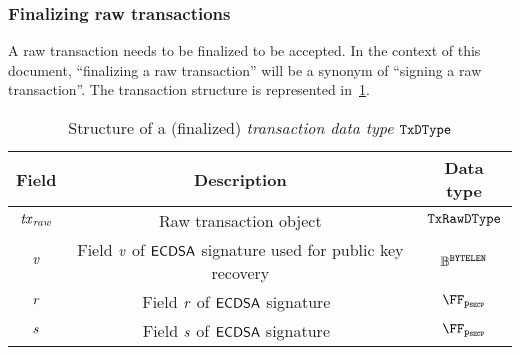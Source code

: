 \subsubsection{Finalizing raw transactions}\label{preliminaries:ethereum:eth-tx:final}
A raw transaction needs to be finalized to be accepted. In the context of this document, ``finalizing a raw transaction'' will be a synonym of ``signing a raw transaction''. The transaction structure is represented in~\cref{preliminaries:tab:eth-signed}.

\begin{table}[H]
    \centering
    \begin{tabular}{ccc}
        Field           & Description & Data type \\ \toprule
        $\mathit{\mathit{tx}_{raw}}$      & Raw transaction object & ${\mathtt{TxRawDType}}$ \\ \midrule
        $\mathit{v}$         & Field $\mathit{v}$ of $\mathsf{ECDSA}$ signature used for public key recovery & $\mathbb{B}^{\mathtt{BYTELEN}}$\\ \midrule
        $\mathit{r}$         & Field $\mathit{r}$ of $\mathsf{ECDSA}$ signature~\cite{rfc6979} & $\FFx{\pSecp}$\\ \midrule
        $\mathit{s}$         & Field $\mathit{s}$ of $\mathsf{ECDSA}$ signature~\cite{rfc6979} & $\FFx{\pSecp}$\\ \bottomrule
    \end{tabular}
    \caption{Structure of a (finalized) \emph{transaction data type} ${\mathtt{TxDType}}$}\label{preliminaries:tab:eth-signed}
\end{table}

